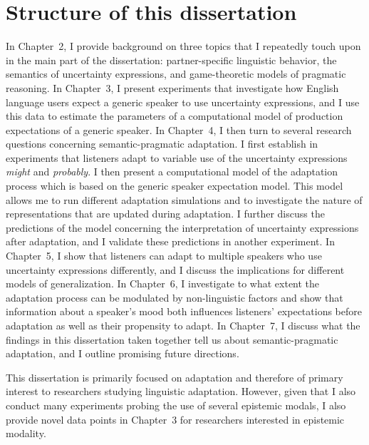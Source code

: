 \section{Structure of this dissertation}

In Chapter~2, I provide background on three topics that I repeatedly
touch upon in the main part of the dissertation: partner-specific linguistic behavior, 
the semantics of uncertainty expressions, and game-theoretic models of pragmatic reasoning.
In Chapter~3, I present experiments that investigate how English language users expect a generic speaker
to use uncertainty expressions, and I use this data to estimate the parameters of a computational model of 
production expectations of a generic speaker. In Chapter~4, I then turn to several research questions concerning
semantic-pragmatic adaptation. I first establish in experiments that listeners adapt to variable use of the uncertainty
expressions \textit{might} and \textit{probably}. I then present a computational model of the adaptation process which
is based on the generic speaker expectation model. This model allows me to run different adaptation simulations and
to investigate the nature of representations that are updated during adaptation. I further discuss the predictions 
of the model concerning the interpretation of uncertainty expressions after adaptation, and I validate these predictions
in another experiment. In Chapter~5, I show that listeners can adapt to multiple speakers who use uncertainty expressions differently,
and I discuss the implications for different models of generalization. In Chapter~6, I investigate to what extent the adaptation
process can be modulated by non-linguistic factors and show that information about a speaker's mood both influences
listeners' expectations before adaptation as well as their propensity to adapt. In Chapter~7, I discuss what the findings in this
dissertation taken together tell us about semantic-pragmatic adaptation, and I outline promising future directions.

This dissertation is primarily focused on adaptation and therefore of primary interest to researchers studying linguistic adaptation.
However, given that I also conduct many experiments probing the use of several epistemic modals, I also provide novel data points in Chapter~3
for researchers interested in epistemic modality.




